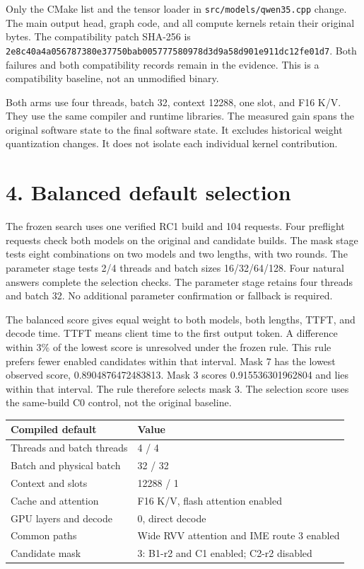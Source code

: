 \documentclass[10pt,a4paper]{article}
\begin{document}
Only the CMake list and the tensor loader in
\nolinkurl{src/models/qwen35.cpp} change. The main output head, graph
code, and all compute kernels retain their original bytes. The
compatibility patch SHA-256 is
\texttt{2e8c40a4\allowbreak{}a0567873\allowbreak{}80e37750\allowbreak{}bab00577\allowbreak{}7580978d\allowbreak{}3d9a58d9\allowbreak{}01e911dc\allowbreak{}12fe01d7}.
Both failures and both compatibility records remain in the evidence.
This is a compatibility baseline, not an unmodified binary.

Both arms use four threads, batch 32, context 12288, one slot, and F16
K/V. They use the same compiler and runtime libraries. The measured gain
spans the original software state to the final software state. It
excludes historical weight quantization changes. It does not isolate
each individual kernel contribution.

\hypertarget{balanced-default-selection}{%
\section{4. Balanced default
selection}\label{balanced-default-selection}}

The frozen search uses one verified RC1 build and 104 requests. Four
preflight requests check both models on the original and candidate
builds. The mask stage tests eight combinations on two models and two
lengths, with two rounds. The parameter stage tests 2/4 threads and
batch sizes 16/32/64/128. Four natural answers complete the selection
checks. The parameter stage retains four threads and batch 32. No
additional parameter confirmation or fallback is required.

The balanced score gives equal weight to both models, both lengths,
TTFT, and decode time. TTFT means client time to the first output token.
A difference within 3\% of the lowest score is unresolved under the
frozen rule. This rule prefers fewer enabled candidates within that
interval. Mask 7 has the lowest observed score, 0.8904876472483813. Mask
3 scores 0.915536301962804 and lies within that interval. The rule
therefore selects mask 3. The selection score uses the same-build C0
control, not the original baseline.

\begin{longtable}[]{@{}ll@{}}
\toprule
Compiled default & Value\tabularnewline
\midrule
\endhead
Threads and batch threads & 4 / 4\tabularnewline
Batch and physical batch & 32 / 32\tabularnewline
Context and slots & 12288 / 1\tabularnewline
Cache and attention & F16 K/V, flash attention enabled\tabularnewline
GPU layers and decode & 0, direct decode\tabularnewline
Common paths & Wide RVV attention and IME route 3 enabled\tabularnewline
Candidate mask & 3: B1-r2 and C1 enabled; C2-r2 disabled\tabularnewline
\bottomrule
\end{longtable}
\end{document}
